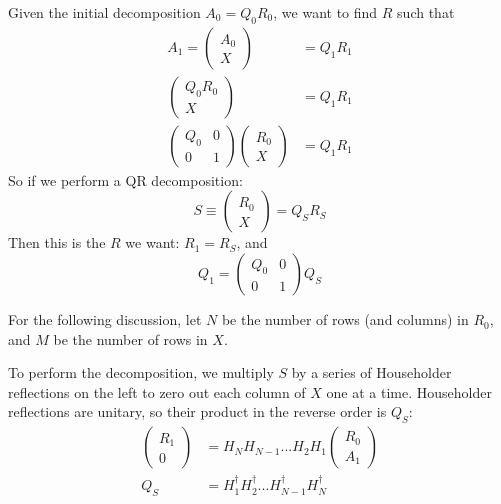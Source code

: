 Given the initial decomposition $A_0 = Q_0 R_0$, we want to find $R$ such that
\begin{align*}
A_1 = \left(\begin{array}{c}A_0 \\ X \end{array}\right) &= Q_1 R_1 \\
\left(\begin{array}{c}Q_0 R_0 \\ X \end{array}\right) &= Q_1 R_1 \\
\left(\begin{array}{cc}Q_0 & 0 \\ 0 & 1 \end{array}\right) 
\left(\begin{array}{c}R_0 \\ X \end{array}\right) &= Q_1 R_1 
\end{align*}
So if we perform a QR decomposition: 
\begin{equation*}
S \equiv \left(\begin{array}{c}R_0 \\ X \end{array}\right) = Q_S R_S
\end{equation*}
Then this is the $R$ we want: $R_1 = R_S$, and 
\begin{equation*}
Q_1 = \left(\begin{array}{cc}Q_0 & 0 \\ 0 & 1 \end{array}\right)  Q_S
\end{equation*}

For the following discussion, let $N$ be the number of rows (and columns) in $R_0$,
and $M$ be the number of rows in $X$.

To perform the decomposition, we multiply $S$ by a series of Householder reflections
on the left to zero out each column of $X$ one at a time.  Householder reflections 
are unitary, so their product in the reverse order is $Q_S$:
\begin{align*}
\left(\begin{array}{c}R_1 \\ 0 \end{array}\right) &=
  H_N H_{N-1} ... H_2 H_1 
  \left(\begin{array}{c}R_0 \\ A_1 \end{array}\right)  \\
Q_S &= H_1^\dagger H_2^\dagger ... H_{N-1}^\dagger H_N^\dagger 
\end{align*}

